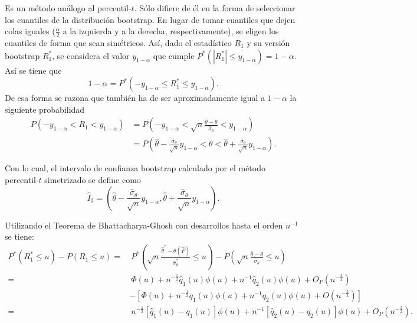 \documentclass[]{book}
\theoremstyle{definition}
\theoremstyle{definition}
\theoremstyle{definition}
\theoremstyle{remark}
\begin{document}
Es un método análogo al percentil-\(t\). Sólo difiere de él en la forma
de seleccionar los cuantiles de la distribución bootstrap. En lugar de
tomar cuantiles que dejen colas iguales (\(\frac{\alpha }{2}\) a la
izquierda y a la derecha, respectivamente), se eligen los cuantiles de
forma que sean simétricos. Así, dado el estadístico \(R_1\) y su versión
bootstrap \(R_1^{\ast}\), se considera el valor \(y_{1-\alpha }\) que
cumple
\(P^{\ast}\left( \left\vert R_1^{\ast}\right\vert \leq y_{1-\alpha } \right) =1-\alpha\).
Así se tiene que
\[1-\alpha =P^{\ast}\left( -y_{1-\alpha }\leq R_1^{\ast}
\leq y_{1-\alpha} \right).\] De esa forma se razona que también ha de
ser aproximadamente igual a \(1-\alpha\) la siguiente probabilidad
\[\begin{aligned}
P\left( -y_{1-\alpha }<R_1<y_{1-\alpha } \right) &= P\left( -y_{1-\alpha }
< \sqrt{n}\frac{\hat{\theta}-\theta }{\hat{\sigma}_{\theta }}
< y_{1-\alpha} \right) \\
&= P\left( \hat{\theta}-\frac{\hat{\sigma}_{\theta }}{\sqrt{n}}y_{1-\alpha
}<\theta <\hat{\theta}+\frac{\hat{\sigma}_{\theta }}{\sqrt{n}}y_{1-\alpha
} \right).
\end{aligned}\]

Con lo cual, el intervalo de confianza bootstrap calculado por el método
percentil-\(t\) simetrizado se define como
\[\hat{I}_3=\left( \hat{\theta}-\frac{\hat{\sigma}_{\theta }}{\sqrt{n}}
y_{1-\alpha },\hat{\theta}+\frac{\hat{\sigma}_{\theta }}{\sqrt{n}}
y_{1-\alpha } \right).\]

Utilizando el Teorema de Bhattacharya-Ghosh con desarrollos hasta el
orden \(n^{-1}\) se tiene: \[\begin{aligned}
P^{\ast}\left( R_1^{\ast}\leq u \right) -P\left( R_1\leq u \right) 
=&\ P^{\ast}\left( \sqrt{n}\frac{\hat{\theta}^{\ast}-\theta \left( \hat{F}
 \right)}{\hat{\sigma}_{\theta }^{\ast}}\leq u \right) -P\left( \sqrt{n}
\frac{\hat{\theta}-\theta }{\hat{\sigma}_{\theta }}\leq u \right) \\
=&\ \Phi \left( u \right) +n^{-\frac{1}{2}}\hat{q}_1\left( u \right) \phi
\left( u \right) +n^{-1}\hat{q}_2\left( u \right) \phi \left( u \right)
+O_{P}\left( n^{-\frac{3}{2}} \right) \\
& -\left[ \Phi \left( u \right) +n^{-\frac{1}{2}}q_1\left( u \right) \phi
\left( u \right) +n^{-1}q_2\left( u \right) \phi \left( u \right) +O\left(
n^{-\frac{3}{2}} \right) \right] \\
=&\ n^{-\frac{1}{2}}\left[ \hat{q}_1\left( u \right) -q_1\left( u \right) 
\right] \phi \left( u \right) 
+n^{-1}\left[ \hat{q}_2\left( u \right) -q_2\left( u \right) \right] \phi
\left( u \right) +O_{P}\left( n^{-\frac{3}{2}} \right).
\end{aligned}\]
\end{document}

